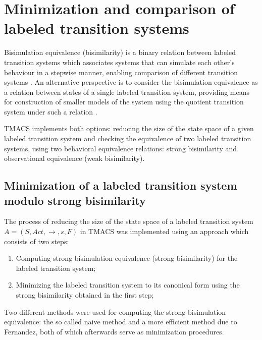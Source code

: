\section{Minimization and comparison of labeled transition systems}
\label{sec:bisimulation}

Bisimulation equivalence (bisimilarity) \cite{Park} is a binary relation between labeled transition systems which associates systems that can simulate each other's behaviour in a stepwise manner, enabling comparison of different transition systems \cite{ModelChecking}. An alternative perspective is to consider the bisimulation equivalence as a relation between states of a single labeled transition system, providing means for construction of smaller models of the system using the quotient transition system under such a relation \cite{ModelChecking}.

TMACS implements both options: reducing the size of the state space of a given labeled transition system and checking the equivalence of two labeled transition systems, using two behavioral equivalence relations: strong bisimilarity and observational equivalence (weak bisimilarity).

\subsection{Minimization of a labeled transition system modulo strong bisimilarity}
The process of reducing the size of the state space of a labeled transition system $A=\left(S, Act, \rightarrow, s, F \right)$ in TMACS was implemented using an approach which consists of two steps:
\begin{enumerate}
\item Computing strong bisimulation equivalence (strong bisimilarity) for the labeled transition system;
\item Minimizing the labeled transition system to its canonical form using the strong bisimilarity obtained in the first step;
\end{enumerate}

Two different methods were used for computing the strong bisimulation equivalence: the so called naive method and a more efficient 
method due to Fernandez, both of which afterwards serve as minimization procedures.

